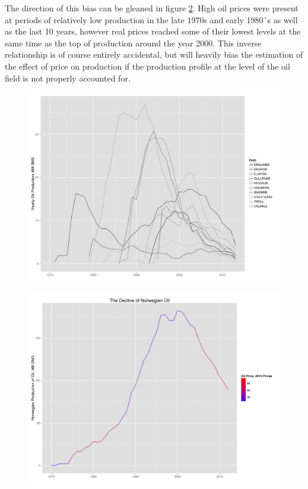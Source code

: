 \documentclass[12pt]{scrartcl} %
\begin{document}
The direction of this bias can be gleaned in figure \ref{oil_decline}.  High oil prices were present at periods of relatively low production in the late 1970s and early 1980´s as well as the last 10 years, however real prices reached some of their lowest levels at the same time as the top of production around the year 2000.  This inverse relationship is of course entirely accidental, but will heavily bias the estimation of the effect of price on production if the production profile at the level of the oil field is not properly accounted for.  

\begin{figure}
	\includegraphics[width=.8\textwidth]{top10_production.png}
	\caption{}
	\label{top10_production}	
	\end{figure}

\begin{figure}
	\includegraphics[width=.8\textwidth]{oil_decline.png}
	\caption{}
	\label{oil_decline}
\end{figure}
\end{document}
